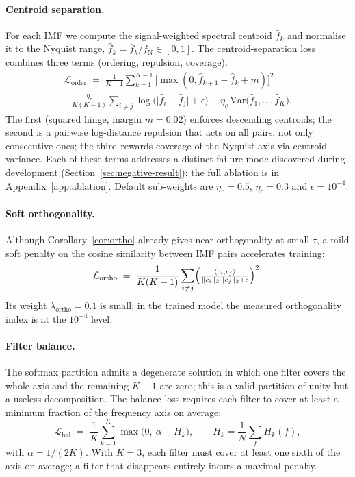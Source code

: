 \documentclass[journal]{IEEEtran}
\theoremstyle{remark}
\newcommand{\Nyq}{f_{\mathrm{N}}}
\begin{document}
\paragraph{Centroid separation.}
For each IMF we compute the signal-weighted spectral centroid
$\bar{f}_{k}$ and normalise it to the Nyquist range,
$\hat{f}_{k} = \bar{f}_{k}/\Nyq \in [0,1]$. The centroid-separation
loss combines three terms (ordering, repulsion, coverage):
\begin{align}
\mathcal{L}_{\mathrm{order}} \;=\;
 \frac{1}{K-1}\sum_{k=1}^{K-1}
   \bigl[\max(0, \hat{f}_{k+1} - \hat{f}_{k} + m)\bigr]^{2} \nonumber\\
-\frac{\eta_{r}}{K(K-1)}\sum_{i \neq j}
    \log\!\bigl(\lvert\hat{f}_{i} - \hat{f}_{j}\rvert + \epsilon\bigr)
-\eta_{c}\,\mathrm{Var}\!\bigl(\hat{f}_{1},\ldots,\hat{f}_{K}\bigr) .
\label{eq:order}
\end{align}
The first (squared hinge, margin $m = 0.02$) enforces descending
centroids; the second is a pairwise log-distance repulsion that acts on
all pairs, not only consecutive ones; the third rewards coverage of the
Nyquist axis via centroid variance. Each of these terms addresses a
distinct failure mode discovered during development
(Section~\ref{sec:negative-result}); the full ablation is in
Appendix~\ref{app:ablation}. Default sub-weights are $\eta_{r}=0.5$,
$\eta_{c}=0.3$ and $\epsilon=10^{-4}$.

\paragraph{Soft orthogonality.}
Although Corollary~\ref{cor:ortho} already gives near-orthogonality at
small $\tau$, a mild soft penalty on the cosine similarity between IMF
pairs accelerates training:
\begin{equation}
\mathcal{L}_{\mathrm{ortho}} \;=\; \frac{1}{K(K-1)}
  \sum_{i\neq j}
  \Bigl(\tfrac{\langle c_{i}, c_{j}\rangle}
              {\|c_{i}\|_{2}\,\|c_{j}\|_{2} + \epsilon}\Bigr)^{2} .
\label{eq:ortho}
\end{equation}
Its weight $\lambda_{\mathrm{ortho}} = 0.1$ is small; in the trained
model the measured orthogonality index is at the $10^{-4}$ level.

\paragraph{Filter balance.}
The softmax partition admits a degenerate solution in which one filter
covers the whole axis and the remaining $K{-}1$ are zero; this is a
valid partition of unity but a useless decomposition. The balance loss
requires each filter to cover at least a minimum fraction of the
frequency axis on average:
\begin{equation}
\mathcal{L}_{\mathrm{bal}} \;=\; \frac{1}{K}
  \sum_{k=1}^{K}
  \max\!\bigl(0,\ \alpha - \overline{H_{k}}\bigr),\qquad
\overline{H_{k}} = \frac{1}{N}\sum_{f} H_{k}(f) ,
\label{eq:balance}
\end{equation}
with $\alpha = 1/(2K)$. With $K=3$, each filter must cover at least one
sixth of the axis on average; a filter that disappears entirely incurs
a maximal penalty.
\end{document}
